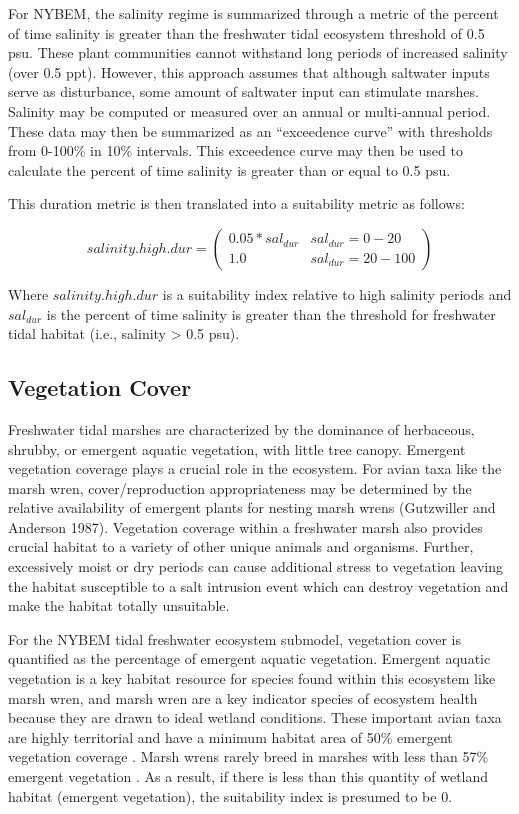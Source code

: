 \documentclass[
]{book}
\begin{document}
For NYBEM, the salinity regime is summarized through a metric of the percent of time salinity is greater than the freshwater tidal ecosystem threshold of 0.5 psu. These plant communities cannot withstand long periods of increased salinity (over 0.5 ppt). However, this approach assumes that although saltwater inputs serve as disturbance, some amount of saltwater input can stimulate marshes. Salinity may be computed or measured over an annual or multi-annual period. These data may then be summarized as an ``exceedence curve'' with thresholds from 0-100\% in 10\% intervals. This exceedence curve may then be used to calculate the percent of time salinity is greater than or equal to 0.5 psu.

This duration metric is then translated into a suitability metric as follows:

\[salinity.high.dur = \begin{pmatrix} 0.05*sal_{dur} & sal_{dur}=0-20\\
1.0 & sal_{dur}=20-100
\end{pmatrix}\]

Where \(salinity.high.dur\) is a suitability index relative to high salinity periods and \(sal_{dur}\) is the percent of time salinity is greater than the threshold for freshwater tidal habitat (i.e., salinity \textgreater{} 0.5 psu).

\hypertarget{vegetation-cover}{%
\subsection{Vegetation Cover}\label{vegetation-cover}}

Freshwater tidal marshes are characterized by the dominance of herbaceous, shrubby, or emergent aquatic vegetation, with little tree canopy. Emergent vegetation coverage plays a crucial role in the ecosystem. For avian taxa like the marsh wren, cover/reproduction appropriateness may be determined by the relative availability of emergent plants for nesting marsh wrens (Gutzwiller and Anderson 1987). Vegetation coverage within a freshwater marsh also provides crucial habitat to a variety of other unique animals and organisms. Further, excessively moist or dry periods can cause additional stress to vegetation leaving the habitat susceptible to a salt intrusion event which can destroy vegetation and make the habitat totally unsuitable.

For the NYBEM tidal freshwater ecosystem submodel, vegetation cover is quantified as the percentage of emergent aquatic vegetation. Emergent aquatic vegetation is a key habitat resource for species found within this ecosystem like marsh wren, and marsh wren are a key indicator species of ecosystem health because they are drawn to ideal wetland conditions. These important avian taxa are highly territorial and have a minimum habitat area of 50\% emergent vegetation coverage \citep{gutzwiller_habitat_1987}. Marsh wrens rarely breed in marshes with less than 57\% emergent vegetation \citep{gutzwiller_habitat_1987}. As a result, if there is less than this quantity of wetland habitat (emergent vegetation), the suitability index is presumed to be 0.
\end{document}
